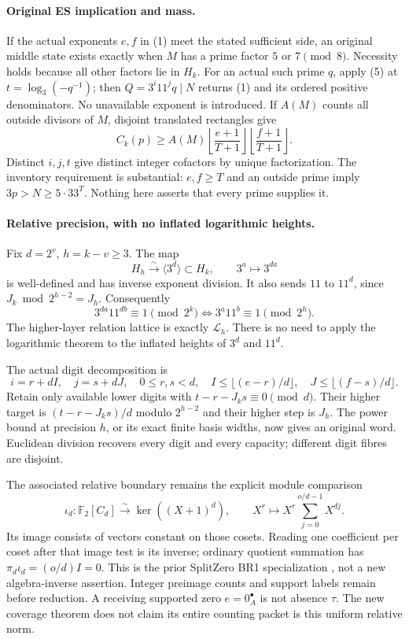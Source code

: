 \documentclass[10pt,a4paper]{article}
\begin{document}
\paragraph{Original ES implication and mass.}
If the actual exponents $e,f$ in (1) meet the stated sufficient side, an original
middle state exists exactly when $M$ has a prime factor $5$ or $7\pmod8$.
Necessity holds because all other factors lie in $H_k$.
For an actual such prime $q$, apply (5) at
$t=\log_3(-q^{-1})$; then $Q=3^i11^jq\mid N$ returns (1) and its ordered
positive denominators. No unavailable exponent is introduced.
If $A(M)$ counts all outside divisors of $M$, disjoint translated rectangles give
\[
 \boxed{C_k(p)\ge A(M)
 \left\lfloor\frac{e+1}{T+1}\right\rfloor
 \left\lfloor\frac{f+1}{T+1}\right\rfloor.}                \tag{6}
\]
Distinct $i,j,t$ give distinct integer cofactors by unique factorization.
The inventory requirement is substantial: $e,f\ge T$ and an outside prime
imply $3p>N\ge5\cdot33^T$. Nothing here asserts that every prime supplies it.

\newpage
\paragraph{Relative precision, with no inflated logarithmic heights.}
Fix $d=2^v$, $h=k-v\ge3$. The map
\[
 H_h\xrightarrow{\sim}\langle3^d\rangle\subset H_k,
 \qquad 3^a\longmapsto3^{da}
\]
is well-defined and has inverse exponent division. It also sends $11$ to
$11^d$, since $J_k\bmod2^{h-2}=J_h$. Consequently
\[
 \boxed{3^{da}11^{db}\equiv1\pmod{2^k}
 \iff3^a11^b\equiv1\pmod{2^h}.}                           \tag{7}
\]
The higher-layer relation lattice is exactly $\mathcal L_h$. There is no need
to apply the logarithmic theorem to the inflated heights of $3^d$ and $11^d$.

The actual digit decomposition is
\[
 i=r+dI,\quad j=s+dJ,\quad0\le r,s<d,
 \quad I\le\lfloor(e-r)/d\rfloor,
 \quad J\le\lfloor(f-s)/d\rfloor.
\]
Retain only available lower digits with $t-r-J_ks\equiv0\pmod d$.
Their higher target is $(t-r-J_ks)/d$ modulo $2^{h-2}$ and their higher
step is $J_h$. The power bound at precision $h$, or its exact finite basis
widths, now gives an original word. Euclidean division recovers every digit
and every capacity; different digit fibres are disjoint.

The associated relative boundary remains the explicit module comparison
\[
 \iota_d:\mathbb F_2[C_d]\xrightarrow{\sim}\ker((X+1)^d),
 \qquad X^r\longmapsto X^r\sum_{j=0}^{o/d-1}X^{dj}.
\]
Its image consists of vectors constant on those cosets. Reading one coefficient
per coset after that image test is its inverse; ordinary quotient summation
has $\pi_d\iota_d=(o/d)I=0$. This is the prior SplitZero BR1 specialization
\cite{SplitZero}, not a new algebra-inverse assertion. Integer preimage counts
and support labels remain before reduction. A receiving supported zero
$e=0_A^\bullet$ is not absence $\tau$. The new coverage theorem does not claim
its entire counting packet is this uniform relative norm.
\end{document}
